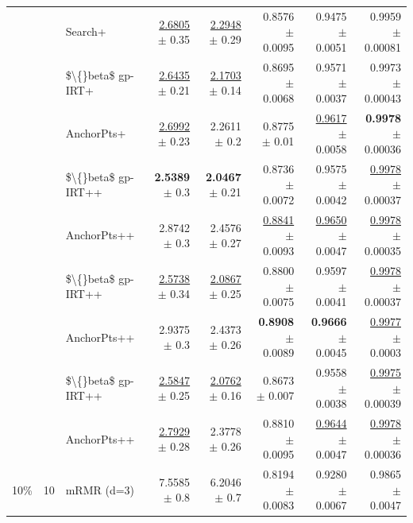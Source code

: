 \begin{longtable}{llp{}rrrrr}
 &  & Search+ & \underline{2.6805} {\scriptsize $\pm$ 0.35} & \underline{2.2948} {\scriptsize $\pm$ 0.29} & 0.8576 {\scriptsize $\pm$ 0.0095} & 0.9475 {\scriptsize $\pm$ 0.0051} & 0.9959 {\scriptsize $\pm$ 0.00081} \\
 &  & \$\textbackslash\{\}beta\$ gp-IRT+ & \underline{2.6435} {\scriptsize $\pm$ 0.21} & \underline{2.1703} {\scriptsize $\pm$ 0.14} & 0.8695 {\scriptsize $\pm$ 0.0068} & 0.9571 {\scriptsize $\pm$ 0.0037} & 0.9973 {\scriptsize $\pm$ 0.00043} \\
 &  & AnchorPts+ & \underline{2.6992} {\scriptsize $\pm$ 0.23} & 2.2611 {\scriptsize $\pm$ 0.2} & 0.8775 {\scriptsize $\pm$ 0.01} & \underline{0.9617} {\scriptsize $\pm$ 0.0058} & \textbf{0.9978} {\scriptsize $\pm$ 0.00036} \\
 &  & \$\textbackslash\{\}beta\$ gp-IRT++ & \textbf{2.5389} {\scriptsize $\pm$ 0.3} & \textbf{2.0467} {\scriptsize $\pm$ 0.21} & 0.8736 {\scriptsize $\pm$ 0.0072} & 0.9575 {\scriptsize $\pm$ 0.0042} & \underline{0.9978} {\scriptsize $\pm$ 0.00037} \\
 &  & AnchorPts++ & 2.8742 {\scriptsize $\pm$ 0.3} & 2.4576 {\scriptsize $\pm$ 0.27} & \underline{0.8841} {\scriptsize $\pm$ 0.0093} & \underline{0.9650} {\scriptsize $\pm$ 0.0047} & \underline{0.9978} {\scriptsize $\pm$ 0.00035} \\
 &  & \$\textbackslash\{\}beta\$ gp-IRT++ & \underline{2.5738} {\scriptsize $\pm$ 0.34} & \underline{2.0867} {\scriptsize $\pm$ 0.25} & 0.8800 {\scriptsize $\pm$ 0.0075} & 0.9597 {\scriptsize $\pm$ 0.0041} & \underline{0.9978} {\scriptsize $\pm$ 0.00037} \\
 &  & AnchorPts++ & 2.9375 {\scriptsize $\pm$ 0.3} & 2.4373 {\scriptsize $\pm$ 0.26} & \textbf{0.8908} {\scriptsize $\pm$ 0.0089} & \textbf{0.9666} {\scriptsize $\pm$ 0.0045} & \underline{0.9977} {\scriptsize $\pm$ 0.0003} \\
 &  & \$\textbackslash\{\}beta\$ gp-IRT++ & \underline{2.5847} {\scriptsize $\pm$ 0.25} & \underline{2.0762} {\scriptsize $\pm$ 0.16} & 0.8673 {\scriptsize $\pm$ 0.007} & 0.9558 {\scriptsize $\pm$ 0.0038} & \underline{0.9975} {\scriptsize $\pm$ 0.00039} \\
 &  & AnchorPts++ & \underline{2.7929} {\scriptsize $\pm$ 0.28} & 2.3778 {\scriptsize $\pm$ 0.26} & 0.8810 {\scriptsize $\pm$ 0.0095} & \underline{0.9644} {\scriptsize $\pm$ 0.0047} & \underline{0.9978} {\scriptsize $\pm$ 0.00036} \\
\midrule
10\% & 10 & mRMR (d=3) & 7.5585 {\scriptsize $\pm$ 0.8} & 6.2046 {\scriptsize $\pm$ 0.7} & 0.8194 {\scriptsize $\pm$ 0.0083} & 0.9280 {\scriptsize $\pm$ 0.0067} & 0.9865 {\scriptsize $\pm$ 0.0047} \\

\end{longtable}
